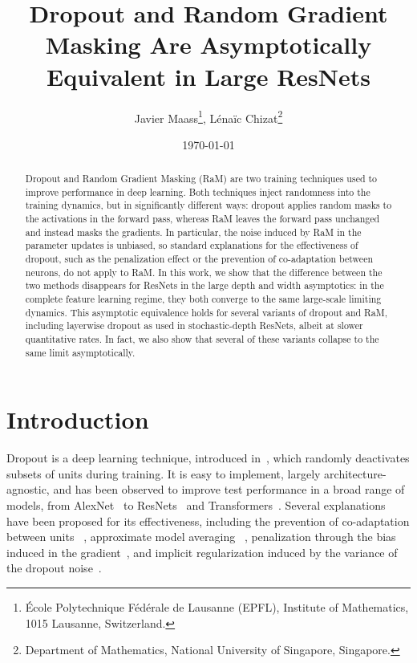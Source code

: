 \documentclass[a4paper,11pt]{article}
\title{Dropout and Random Gradient Masking Are Asymptotically Equivalent in Large ResNets}
\author{
Javier Maass\thanks{École Polytechnique Fédérale de Lausanne (EPFL),  Institute of Mathematics, 1015 Lausanne, Switzerland.},\quad
Lénaïc Chizat\thanks{Department of Mathematics,
National University of Singapore, Singapore.}
}
\date{\today}
\newcommand{\1}{\mathbbm{1}}
\theoremstyle{definition}
\theoremstyle{remark}
\begin{document}
\maketitle

\begin{abstract}
Dropout and Random Gradient Masking (RaM) are two training techniques used to improve performance in deep learning. 
Both techniques inject  randomness into the training dynamics, but in significantly different ways: dropout applies random masks to the activations in the forward pass, whereas RaM leaves the forward pass unchanged and instead masks the gradients. In particular, the noise induced by RaM in the parameter updates is unbiased, so standard explanations for the effectiveness of dropout, such as the penalization effect or the prevention of co-adaptation between neurons, do not apply to RaM. In this work, we show that the difference between the two methods disappears for ResNets in the large depth and width asymptotics: in the complete feature learning regime, they both converge to the same large-scale limiting dynamics. This asymptotic equivalence holds for several variants of dropout and RaM, including layerwise dropout as used in stochastic-depth ResNets, albeit at slower quantitative rates. In fact, we also show that several of these variants collapse to the same limit asymptotically.
\end{abstract}

\section{Introduction}

Dropout is a deep learning technique, introduced
in~\cite{hinton2012improvingneuralnetworkspreventing}, which randomly deactivates 
subsets of units during training. It is easy to implement, largely architecture-agnostic,
and has been observed to improve test performance in a broad range of models, from
AlexNet~\cite{alexnet2012} to ResNets~\cite{he2015deepresiduallearningimage} and
Transformers~\cite{vaswani2017attention}. Several explanations have been proposed for
its effectiveness, including the prevention of co-adaptation between units
~\cite{hinton2012improvingneuralnetworkspreventing}, approximate model averaging
~\cite{baldi2013understanding}, penalization through the bias induced in the
gradient~\cite{mianjy2018implicit}, and implicit regularization induced by the variance
of the dropout noise~\cite{wei2020implicitexplicitregularizationeffects}.
\end{document}
